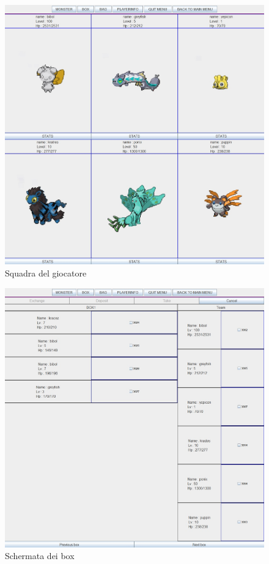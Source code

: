 \begin{figure}[H]
\centering
\includegraphics[scale=\x]{Screenshot/inventory.jpg}
\caption{Squadra del giocatore}
\label{img:inventory}
\end{figure}

\begin{figure}[H]
\centering
\includegraphics[scale=\x]{Screenshot/storage.jpg}
\caption{Schermata dei box}
\label{img:storage}
\end{figure}


